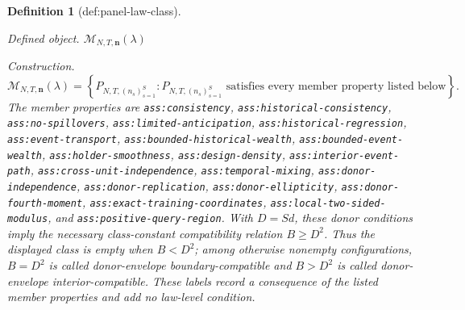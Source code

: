 \documentclass{article}
\newtheorem{definition}{Definition}
\begin{document}
\begin{definition}[def:panel-law-class]\label{def:panel-law-class}
\par\smallskip\noindent\emph{Defined object.} \(\mathcal M_{N,T,\mathbf n}(\lambda)\)
\par\smallskip\noindent\emph{Construction.} \[
\mathcal M_{N,T,\mathbf n}(\lambda)
=\left\{P_{N,T,(n_s)_{s=1}^{S}}:
P_{N,T,(n_s)_{s=1}^{S}}\text{ satisfies every member property listed below}\right\}.
\]
The member properties are \texttt{ass:consistency}, \texttt{ass:historical-consistency}, \texttt{ass:no-spillovers}, \texttt{ass:limited-anticipation}, \texttt{ass:historical-regression}, \texttt{ass:event-transport}, \texttt{ass:bounded-historical-wealth}, \texttt{ass:bounded-event-wealth}, \texttt{ass:holder-smoothness}, \texttt{ass:design-density}, \texttt{ass:interior-event-path}, \texttt{ass:cross-unit-independence}, \texttt{ass:temporal-mixing}, \texttt{ass:donor-independence}, \texttt{ass:donor-replication}, \texttt{ass:donor-ellipticity}, \texttt{ass:donor-fourth-moment}, \texttt{ass:exact-training-coordinates}, \texttt{ass:local-two-sided-modulus}, and \texttt{ass:positive-query-region}.  With \(D=Sd\), these donor conditions imply the necessary class-constant compatibility relation \(B\ge D^2\).  Thus the displayed class is empty when \(B<D^2\); among otherwise nonempty configurations, \(B=D^2\) is called donor-envelope boundary-compatible and \(B>D^2\) is called donor-envelope interior-compatible.  These labels record a consequence of the listed member properties and add no law-level condition.


\end{definition}
\end{document}
